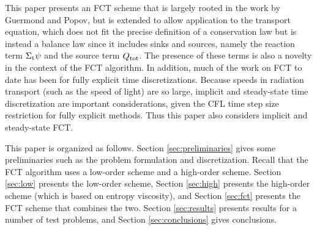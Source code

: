 This paper presents an FCT scheme that is largely rooted in the work by Guermond
and Popov, but is extended to allow application to the transport equation,
which does not fit the precise definition of a conservation law but is instead a
balance law since it includes sinks and sources, namely the reaction term
$\Sigma_\textup{t}\psi$ and the source term $Q_\textup{tot}$. The presence
of these terms is also a novelty in the context of the FCT algorithm.
In addition, much of the work on FCT to date has been for fully explicit time
discretizations. Because speeds in radiation transport (such as the speed of light)
are so large, implicit and steady-state time discretization are important
considerations, given the CFL time step size restriction for fully explicit
methods. Thus this paper also considers implicit and steady-state FCT.

This paper is organized as follows. Section \ref{sec:preliminaries} gives
some preliminaries such as the problem formulation and discretization.
Recall that the FCT algorithm uses a low-order scheme and a high-order scheme.
Section \ref{sec:low} presents the low-order scheme, Section \ref{sec:high}
presents the high-order scheme (which is based on entropy viscosity),
and Section \ref{sec:fct} presents the FCT scheme that combines the two. Section
\ref{sec:results} presents results for a number of test problems, and
Section \ref{sec:conclusions} gives conclusions.
